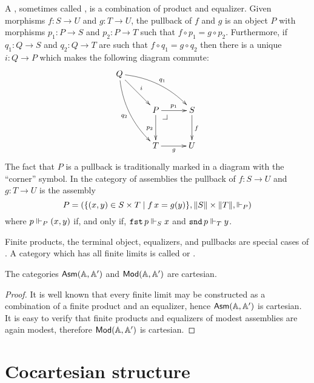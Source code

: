 A , sometimes called , is a
combination of product and equalizer. Given morphisms $f : S \to U$
and $g : T \to U$, the pullback of $f$ and $g$ is an object $P$ with
morphisms $p_1 : P \to S$ and $p_2 : P \to T$ such that $f \circ p_1 =
g \circ p_2$. Furthermore, if $q_1 : Q \to S$ and $q_2 : Q \to T$ are
such that $f \circ q_1 = g \circ q_2$ then there is a unique $i : Q
\to P$ which makes the following diagram commute:
%
\begin{equation*}
  \xymatrix@+0.5em{
    {Q}
    \ar[dr]^{i}
    \ar@/_1em/[ddr]_{q_2}
    \ar@/^1em/[rrd]^{q_1}
    &
    &
    \\
    &
    {P} \pbcorner
    \ar[r]^{p_1}
    \ar[d]_{p_2}
    &
    {S}
    \ar[d]^{f}
    \\
    &
    {T}
    \ar[r]_{g}
    &
    {U}
  }
\end{equation*}
%
The fact that $P$ is a pullback is traditionally marked in a diagram
with the ``corner'' symbol. In the category of assemblies the pullback
of $f : S \to U$ and $g : T \to U$ is the
assembly
%
\begin{equation*}
  P = (\set{(x,y) \in S \times T \such f\,x = g(y)}, \T{S} \times
  \T{T}, {\rz[P]})
\end{equation*}
%
where $p \rz[P] (x,y)$ if, and only if, $\combFst\,p
\rz[S] x$ and $\combSnd\,p \rz[T] y$.

Finite products, the terminal object, equalizers, and pullbacks are
special cases of . A category which has all finite
limits is called  or .

\begin{proposition}
  \label{prop:asm-cartesian}%
  The categories $\AsmA$ and $\Mod{\AA, \subAA}$ are cartesian.
\end{proposition}

\begin{proof}
  It is well known that every finite limit may be constructed as a
  combination of a finite product and an equalizer, hence $\AsmA$ is
  cartesian. It is easy to verify that finite products and equalizers
  of modest assemblies are again modest, therefore $\Mod{\AA,
    \subAA}$ is cartesian.
\end{proof}


\section{Cocartesian structure}
\label{sec:cocartesian-structure}



